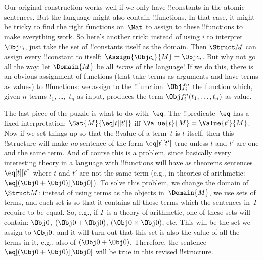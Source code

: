 Our original construction works well if we only have !!{constant}s in
the atomic sentences.  But the language might also contain
!!{function}s.  In that case, it might be tricky to find the right
functions on~$\Nat$ to assign to these !!{function}s to make
everything work.  So here's another trick: instead of using $i$ to
interpret $\Obj c_i$, just take the set of !!{constant}s itself as the
domain.  Then $\Struct M$ can assign every !!{constant} to itself:
$\Assign{\Obj c_i}{M} = \Obj c_i$.  But why not go all the way: let
$\Domain{M}$ be all \emph{terms} of the language!{} If we do this,
there is an obvious assignment of functions (that take terms as
arguments and have terms as values) to !!{function}s: we assign to the
!!{function}~$\Obj f^n_i$ the function which, given $n$ terms $t_1$,
\dots,~$t_n$ as input, produces the term $\Obj f^n_i(t_1, \dots, t_n)$
as value.

The last piece of the puzzle is what to do with~$\eq$.  The
!!{predicate}~$\eq$ has a fixed interpretation: $\Sat{M}{\eq[t][t']}$
iff $\Value{t}{M} = \Value{t'}{M}$.  Now if we set things up so that the
!!{value} of a term~$t$ is $t$ itself, then this !!{structure}
will make \emph{no} sentence of the form $\eq[t][t']$ true
unless $t$ and $t'$ are one and the same term.  And of
course this is a problem, since basically every interesting theory in
a language with !!{function}s will have as theorems sentences
$\eq[t][t']$ where $t$ and $t'$ are not the same term (e.g., in
theories of arithmetic: $\eq[(\Obj 0+ \Obj 0)][\Obj 0]$).  To solve
this problem, we change the domain of~$\Struct M$: instead of using terms as
the objects in~$\Domain{M}$, we use sets of terms, and each set is so
that it contains all those terms which the sentences in~$\Gamma$
require to be equal.  So, e.g., if $\Gamma$ is a theory of arithmetic,
one of these sets will contain: $\Obj 0$, $(\Obj 0 + \Obj 0)$, $(\Obj
0 \times \Obj 0)$, etc.  This will be the set we assign to $\Obj 0$,
and it will turn out that this set is also the value of all the terms
in it, e.g., also of $(\Obj 0 + \Obj 0)$.  Therefore, the sentence
$\eq[(\Obj 0+ \Obj 0)][\Obj 0]$ will be true in this revised
!!{structure}.

